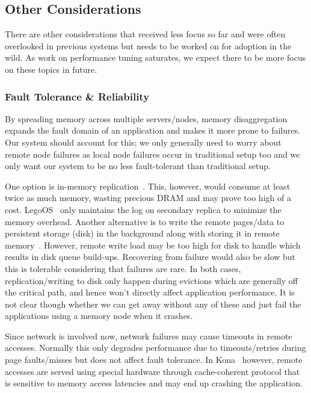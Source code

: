
\subsection{Other Considerations}
There are other considerations that received less focus so far 
and were often overlooked in previous systems but needs to be 
worked on for adoption in the wild. As work on performance tuning 
saturates, we expect there to be more focus on these topics in future. 


\subsubsection{Fault Tolerance \& Reliability}
By spreading memory across multiple servers/nodes, memory 
disaggregation expands the fault domain of an application 
and makes it more prone to failures. Our system should account
for this; we only generally need to worry about remote node 
failures as local node failures occur in traditional 
setup too and we only want our system to be no less 
fault-tolerant than traditional setup.

One option is in-memory replication~\cite{leap,kona}.
This, however, would consume at least twice as much memory,
wasting precious DRAM and may prove too high of a cost. 
LegoOS~\cite{legoos} only maintains the log on secondary 
replica to minimize the memory overhead. Another alternative 
is to write the remote pages/data to persistent storage (disk) 
in the background along with storing it in remote 
memory~\cite{infiniswap}. However, remote write load 
may be too high for disk to handle which results in 
disk queue build-ups. Recovering from failure would also be 
slow but this is tolerable considering that failures are rare.
In both cases, replication/writing to disk only happen 
during evictions which are generally off the critical path,
and hence won't directly affect application performance.
It is not clear though whether we can get away without 
any of these and just fail the applications using a memory
node when it crashes.

Since network is involved now, network failures may cause 
timeouts in remote accesses. Normally this only degrades 
performance due to timeouts/retries during page faults/misses
but does not affect fault tolerance. In Kona~\cite{kona} however,
remote accesses are served using special hardware through 
cache-coherent protocol that is sensitive to memory access 
latencies and may end up crashing the application.

